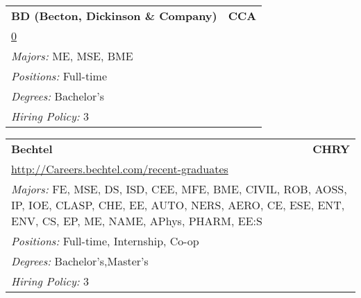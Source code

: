 \documentclass[twoside]{article}
\begin{document}
\begin{center}
\begin{multicols}{3}
\begin{FlushLeft}
\begin{minipage}{.9\columnwidth}
\end{minipage}
 
\begin{minipage}{.9\columnwidth}\begin{tabularx}{.95\columnwidth}{Xr}
                 {\Large\bf BD (Becton, Dickinson \& Company)} & {\Large\bf CCA}\\
    \multicolumn{2}{p{.95\columnwidth}}{\url{0}}\\
    \multicolumn{2}{p{.95\columnwidth}}{\emph{Majors:} ME, MSE, BME}\\
    \multicolumn{2}{p{.95\columnwidth}}{\emph{Positions:} Full-time}\\
    \multicolumn{2}{p{.95\columnwidth}}{\emph{Degrees:} Bachelor's}\\
    \multicolumn{2}{p{.95\columnwidth}}{\emph{Hiring Policy:} 3}\\
    \end{tabularx}
    
\end{minipage}
 
\begin{minipage}{.9\columnwidth}\begin{tabularx}{.95\columnwidth}{Xr}
                 {\Large\bf Bechtel} & {\Large\bf CHRY}\\
    \multicolumn{2}{p{.95\columnwidth}}{\url{http://Careers.bechtel.com/recent-graduates}}\\
    \multicolumn{2}{p{.95\columnwidth}}{\emph{Majors:} FE, MSE, DS, ISD, CEE, MFE, BME, CIVIL, ROB, AOSS, IP, IOE, CLASP, CHE, EE, AUTO, NERS, AERO, CE, ESE, ENT, ENV, CS, EP, ME, NAME, APhys, PHARM, EE:S}\\
    \multicolumn{2}{p{.95\columnwidth}}{\emph{Positions:} Full-time, Internship, Co-op}\\
    \multicolumn{2}{p{.95\columnwidth}}{\emph{Degrees:} Bachelor's,Master's}\\
    \multicolumn{2}{p{.95\columnwidth}}{\emph{Hiring Policy:} 3}\\
    \end{tabularx}
    
\end{minipage}
 

\end{FlushLeft}
\end{multicols}
\end{center}
\end{document}
